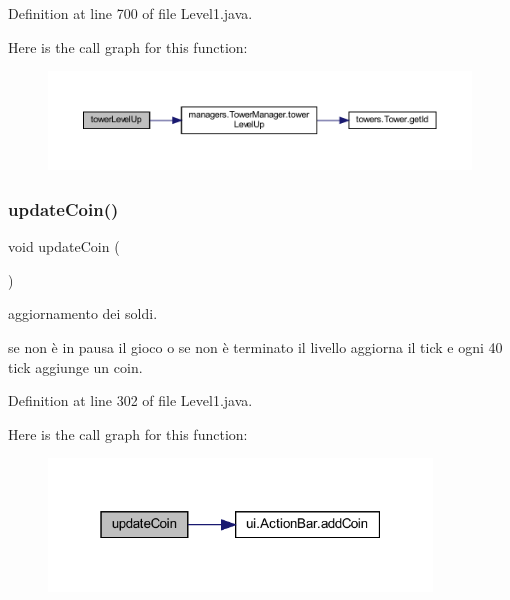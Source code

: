 Definition at line 700 of file Level1.\+java.

Here is the call graph for this function\+:
\nopagebreak
\begin{figure}[H]
\begin{center}
\leavevmode
\includegraphics[width=350pt]{classscenes_1_1_level1_a8a3c715fcfd3d65e1d8241a1fa4965ff_cgraph}
\end{center}
\end{figure}
\mbox{\label{classscenes_1_1_level1_a7ca93fcd8c7440e7b3f64c595a5be28c}} 
\subsubsection{\texorpdfstring{update\+Coin()}{updateCoin()}}
{\footnotesize\ttfamily void update\+Coin (\begin{DoxyParamCaption}{ }\end{DoxyParamCaption})}



aggiornamento dei soldi. 

se non è in pausa il gioco o se non è terminato il livello aggiorna il tick e ogni 40 tick aggiunge un coin. 

Definition at line 302 of file Level1.\+java.

Here is the call graph for this function\+:\nopagebreak
\begin{figure}[H]
\begin{center}
\leavevmode
\includegraphics[width=289pt]{classscenes_1_1_level1_a7ca93fcd8c7440e7b3f64c595a5be28c_cgraph}
\end{center}
\end{figure}
\mbox{\label{classscenes_1_1_level1_af005ec68c869a6acd5e833cba9330a50}} 
